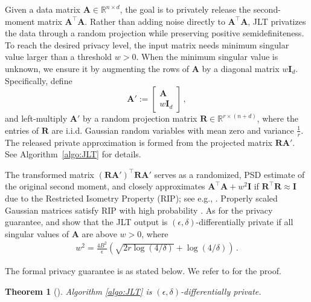 \documentclass[11pt]{article}
\newtheorem{theorem}{Theorem}%
\newcommand{\bI}{\boldsymbol{I}}
\newcommand{\bA}{\boldsymbol{A}}
\newcommand{\bR}{\boldsymbol{R}}
\newcommand{\mbR}{\mathbb{R}}
\begin{document}
Given a data matrix $\bA\in\mbR^{n\times d}$, the goal is to privately release the second-moment matrix $\bA^\top \bA$. Rather than adding noise directly to $\bA^\top \bA$, JLT privatizes the data through a random projection while preserving positive semidefiniteness. To reach the desired privacy level, the input matrix needs minimum singular value larger than a threshold $w>0$. When the minimum singular value is unknown, we ensure it by augmenting the rows of $\bA$ by a diagonal matrix $w\bI_d$. Specifically, define
\[
\bA' := \begin{bmatrix}\bA \\ w\bI_d\end{bmatrix}\,,
\]
and left-multiply $\bA'$ by a random projection matrix $\bR\in\mbR^{r \times (n+d)}$, where the entries of $\bR$ are i.i.d. Gaussian random variables with mean zero and variance $\frac{1}{r}$. The released private approximation is formed from the projected matrix $\bR\bA'$. See Algorithm~\ref{algo:JLT} for details.

The transformed matrix $(\bR\bA')^\top \bR\bA'$ serves as a randomized, PSD estimate of the original second moment, and closely approximates $\bA^\top\bA + w^2\bI$ if $\bR^\top\bR\approx \bI$ due to the Restricted Isometry Property (RIP); see e.g., \cite{candestao05}. Properly scaled Gaussian matrices satisfy RIP with high probability \citep{vershynin11}. As for the privacy guarantee, \cite{blocki2012johnsonlindenstrauss} and \cite{sheffet2015private} show that the JLT output is $(\epsilon,\delta)$-differentially private if all singular values of $\bA$ are above $w>0$, where
\begin{align}\label{eq:w-2}
w^2=\frac{4B^2}{\epsilon}\left(\sqrt{2r\log(4/\delta)}+\log(4/\delta)\right)\,.
\end{align}

The formal privacy guarantee is as stated below. We refer to \cite[Theorem A.1]{pmlr-v70-sheffet17a} for the proof.
\begin{theorem}[\cite{pmlr-v70-sheffet17a}]
    Algorithm \ref{algo:JLT} is $(\epsilon,\delta)$-differentially private.
\end{theorem}
\end{document}
